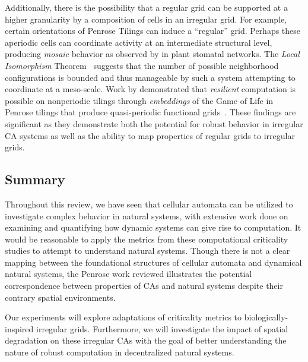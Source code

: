 \documentclass[a4paper,11pt]{article}
\begin{document}
Additionally, there is the possibility that a regular grid can be supported at a higher granularity by a composition of cells in an irregular grid.
For example, certain orientations of Penrose Tilings can induce a ``regular'' grid.
Perhaps these aperiodic cells can coordinate activity at an intermediate structural level, producing \textit{mosaic} behavior as observed by \citeauthor{me07} in plant stomatal networks.
The \textit{Local Isomorphism} Theorem~\cite{ef06}
suggests that the number of possible neighborhood configurations is bounded and thus manageable by such a system attempting to coordinate at a meso-scale.
Work by \citeauthor{ba13} demonstrated that \textit{resilient} computation is possible on nonperiodic tilings through \textit{embeddings} of the Game of Life in Penrose tilings that produce quasi-periodic functional grids~\cite{ba13}.
These findings are significant as they demonstrate both the potential for robust behavior in irregular CA systems as well as the ability to map properties of regular grids to irregular grids.

\subsection{Summary}
\label{sec:PrevSum}

Throughout this review, we have seen that cellular automata can be utilized to investigate complex behavior in natural systems, with extensive work done on examining and quantifying how dynamic systems can give rise to computation.
It would be reasonable to apply the metrics from these computational criticality studies to attempt to understand natural systems.
Though there is not a clear mapping between the foundational structures of cellular automata and dynamical natural systems, the Penrose work reviewed illustrates the potential correspondence between properties of CAs and natural systems despite their contrary spatial environments.

Our experiments will explore adaptations of criticality metrics to biologically-inspired irregular grids.
Furthermore, we will investigate the impact of spatial degradation on these irregular CAs with the goal of better understanding the nature of robust computation in decentralized natural systems.

\end{document}
